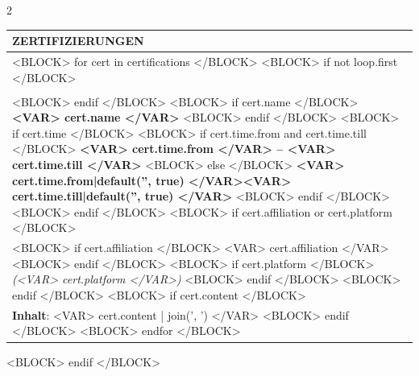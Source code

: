 \documentclass[<VAR> meta.fontsize|default('10pt', true) </VAR>]{extarticle} %
\begin{document}
\begin{paracol}{2}
\begin{tabularx}{\columnwidth}{>{\raggedright\arraybackslash}X}
    \large\textbf{ZERTIFIZIERUNGEN} \\
    \toprule[1pt]

    <BLOCK> for cert in certifications </BLOCK>
        <BLOCK> if not loop.first </BLOCK>

        \\\\
        \toprule[0.5pt]
        <BLOCK> endif </BLOCK>
        <BLOCK> if cert.name </BLOCK>
        \textbf{<VAR> cert.name </VAR>}
        <BLOCK> endif </BLOCK>
        <BLOCK> if cert.time </BLOCK>
        <BLOCK> if cert.time.from and cert.time.till </BLOCK>
        \hfill \textbf{<VAR> cert.time.from </VAR> – <VAR> cert.time.till </VAR>}
        <BLOCK> else </BLOCK>
        \hfill \textbf{<VAR> cert.time.from|default('', true) </VAR><VAR> cert.time.till|default('', true) </VAR>}
        <BLOCK> endif </BLOCK>
        <BLOCK> endif </BLOCK>
        <BLOCK> if cert.affiliation or cert.platform </BLOCK>
        \\
        <BLOCK> if cert.affiliation </BLOCK>
        <VAR> cert.affiliation </VAR> 
        <BLOCK> endif </BLOCK>
        <BLOCK> if cert.platform </BLOCK>
        \textit{(<VAR> cert.platform </VAR>)} 
        <BLOCK> endif </BLOCK>
        <BLOCK> endif </BLOCK>
        <BLOCK> if cert.content </BLOCK>
        \\
        \textbf{Inhalt}: 
        <VAR> cert.content | join(', ') </VAR>
        <BLOCK> endif </BLOCK>
    <BLOCK> endfor </BLOCK>

\end{tabularx}
<BLOCK> endif </BLOCK>

\end{paracol}
\end{document}
